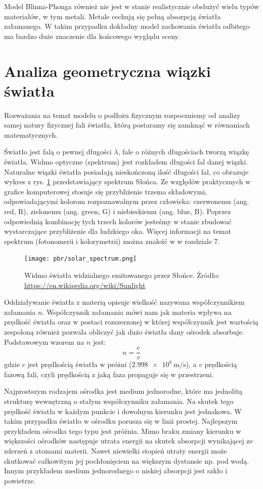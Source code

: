 \documentclass[../main.tex]{subfiles}
\begin{document}
Model Blinna-Phonga również nie jest w stanie realistycznie obsłużyć wielu
typów materiałów, w tym metali. Metale cechują się pełną absorpcją światła
załamanego. W takim przypadku dokładny model zachowania światła odbitego ma
bardzo duże znaczenie dla końcowego wyglądu sceny.

\section{Analiza geometryczna wiązki światła}

Rozważania na temat modelu o podłożu fizycznym rozpoczniemy od analizy samej natury fizycznej fali światła, którą postaramy się zamknąć w równaniach matematycznych. 

Światło jest falą o pewnej długości $\lambda$, fale o różnych długościach tworzą wiązkę światła. Widmo optyczne (spektrum) jest rozkładem długości fal danej
wiązki. Naturalne wiązki światła posiadają nieskończoną ilość długości fal, co obrazuje wykres z rys. \ref{fig:solar_spectrum} przedstawiający spektrum Słońca.  
Ze względów praktycznych w grafice komputerowej stosuje się przybliżenie trzema składowymi, odpowiadającymi kolorom rozpoznawalnym przez człowieka: czerwonemu (ang. red, R), zielonemu (ang. green, G) i niebieskiemu (ang. blue, B). Poprzez odpowiednią kombinację tych trzech kolorów jesteśmy w stanie zbudować wystarczające przybliżenie dla ludzkiego oka. Więcej informacji na temat spektrum (fotonomerii i kolorymetrii) można znaleźć w \cite{RealTimeRendering2008} w rozdziale 7.

\begin{figure}[ht]
  \centering
  \texttt{[image: pbr/solar\_spectrum.png]}
  \caption{Widmo światła widzialnego emitowanego przez Słońce. Źródło: \url{https://en.wikipedia.org/wiki/Sunlight}}
  \label{fig:solar_spectrum}
\end{figure}

Oddziaływanie światła z materią opisuje wielkość nazywana współczynnikiem załamania $n$. Współczynnik załamania mówi nam jak materia wpływa na prędkość światła oraz w postaci rozszerzonej w której współczynnik jest wartością zespoloną również pozwala obliczyć jak dużo światła dany ośrodek absorbuje. Podstawowym wzorem na $n$ jest:
\[
    n = \frac{c}{v}
\]
gdzie $c$ jest prędkością światła w próżni ($\SI{2.998e8}{\meter\per\second}$), a $v$ prędkością fazową fali, czyli prędkością z jaką faza propaguje się w przestrzeni.

Najprostszym rodzajem ośrodka jest medium jednorodne, które ma jednolitą strukturę wewnętrzną o stałym współczynniku załamania. Na skutek tego prędkość światła w każdym punkcie i dowolnym kierunku jest jednakowa. W takim przypadku światło w ośrodku porusza się w linii prostej. Najlepszym przykładem ośrodka tego typu jest próżnia. Mimo braku zmiany kierunku w większości ośrodków następuje utrata energii na skutek absorpcji wynikającej ze zderzeń z atomami materii. Nawet niewielki stopień utraty energii może skutkować całkowitym jej pochłonięciem na większym dystansie np. pod wodą. Innym przykładem medium jednorodnego o niskiej absorpcji jest szkło i powietrze.
\end{document}
